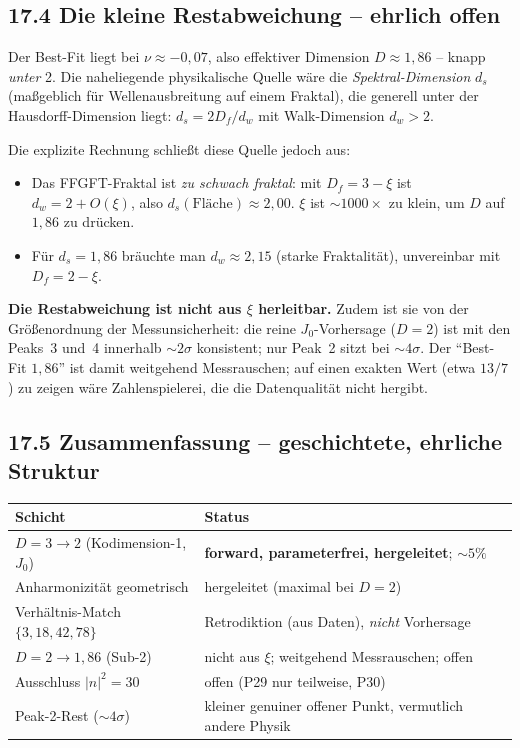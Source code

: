 \subsection*{17.4 Die kleine Restabweichung -- ehrlich offen}

Der Best-Fit liegt bei $\nu\approx-0{,}07$, also effektiver Dimension
$D\approx1{,}86$ -- knapp \emph{unter} 2. Die naheliegende physikalische
Quelle wäre die \emph{Spektral-Dimension} $d_s$ (maßgeblich für
Wellenausbreitung auf einem Fraktal), die generell unter der
Hausdorff-Dimension liegt: $d_s = 2D_f/d_w$ mit Walk-Dimension $d_w>2$.

Die explizite Rechnung schließt diese Quelle jedoch aus:
\begin{itemize}
  \item Das FFGFT-Fraktal ist \emph{zu schwach fraktal}: mit
        $D_f=3-\xi$ ist $d_w = 2+O(\xi)$, also $d_s(\text{Fläche})\approx2{,}00$.
        $\xi$ ist $\sim1000\times$ zu klein, um $D$ auf $1{,}86$ zu drücken.
  \item Für $d_s=1{,}86$ bräuchte man $d_w\approx2{,}15$ (starke
        Fraktalität), unvereinbar mit $D_f=2-\xi$.
\end{itemize}
\textbf{Die Restabweichung ist nicht aus $\xi$ herleitbar.} Zudem ist sie
von der Größenordnung der Messunsicherheit: die reine $J_0$-Vorhersage
($D=2$) ist mit den Peaks~3 und~4 innerhalb $\sim2\sigma$ konsistent; nur
Peak~2 sitzt bei $\sim4\sigma$. Der ``Best-Fit $1{,}86$'' ist damit
weitgehend Messrauschen; auf einen exakten Wert (etwa $13/7$) zu zeigen
wäre Zahlenspielerei, die die Datenqualität nicht hergibt.

\subsection*{17.5 Zusammenfassung -- geschichtete, ehrliche Struktur}

\begin{center}
\begin{tabular}{p{5.5cm}p{6.5cm}}
\toprule
\textbf{Schicht} & \textbf{Status} \\
\midrule
$D=3\to2$ (Kodimension-1, $J_0$) &
  \textbf{forward, parameterfrei, hergeleitet}; $\sim5\%$ \\
Anharmonizität geometrisch &
  hergeleitet (maximal bei $D=2$) \\
Verhältnis-Match $\{3,18,42,78\}$ &
  Retrodiktion (aus Daten), \emph{nicht} Vorhersage \\
$D=2\to1{,}86$ (Sub-2) &
  nicht aus $\xi$; weitgehend Messrauschen; offen \\
Ausschluss $|n|^2=30$ &
  offen (P29 nur teilweise, P30) \\
Peak-2-Rest ($\sim4\sigma$) &
  kleiner genuiner offener Punkt, vermutlich andere Physik \\
\bottomrule
\end{tabular}
\end{center}

